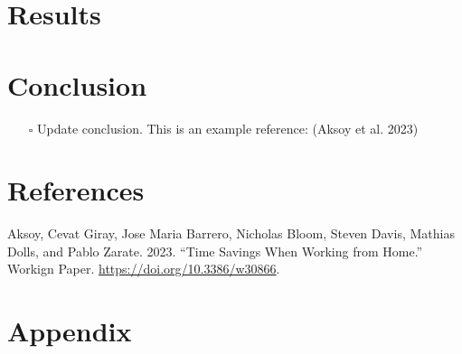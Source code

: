 \documentclass[
  11pt,
  letterpaper,
  DIV=11,
  numbers=noendperiod]{scrartcl}
\providecommand{\tightlist}{%
  \setlength{\itemsep}{0pt}\setlength{\parskip}{0pt}}\usepackage{longtable,booktabs,array}
\newlength{\cslhangindent}
\newenvironment{CSLReferences}[2] %
 {\begin{list}{}{%
  \setlength{\itemindent}{0pt}
  \setlength{\leftmargin}{0pt}
  \setlength{\parsep}{0pt}
  \ifodd #1
   \setlength{\leftmargin}{\cslhangindent}
   \setlength{\itemindent}{-1\cslhangindent}
  \fi
  \setlength{\itemsep}{#2\baselineskip}}}
 {\end{list}}
\begin{document}
\newpage

\section{Results}\label{results}

\section{Conclusion}\label{conclusion}

\begin{itemize}
\tightlist
\item[$\square$]
  Update conclusion. This is an example reference: (Aksoy et al. 2023)
\end{itemize}

\section*{References}\label{references}

\label{refs}
\begin{CSLReferences}{1}{0}
Aksoy, Cevat Giray, Jose Maria Barrero, Nicholas Bloom, Steven Davis,
Mathias Dolls, and Pablo Zarate. 2023. {``Time {Savings When Working}
from {Home}.''} Workign Paper. \url{https://doi.org/10.3386/w30866}.

\end{CSLReferences}

\newpage

\setcounter{section}{0}
\renewcommand{\thesection}{\Alph{section}}

\setcounter{table}{0}
\renewcommand{\thetable}{A\arabic{table}}

\setcounter{figure}{0}
\renewcommand{\thefigure}{A\arabic{figure}}

\section{Appendix}\label{appendix}
\end{document}
